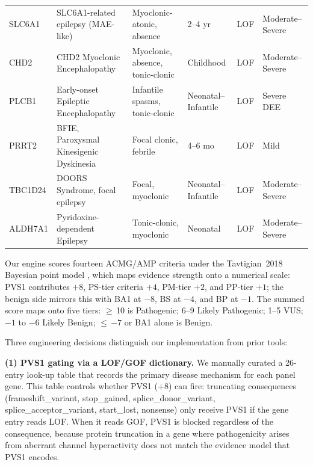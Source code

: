 \documentclass[12pt,a4paper]{article}
\begin{document}
\begin{longtable}{p{1.1cm}p{3.5cm}p{3.5cm}p{2.2cm}p{0.8cm}p{2.2cm}}
SLC6A1  & SLC6A1-related epilepsy (MAE-like)          & Myoclonic-atonic, absence               & 2--4 yr               & LOF     & Moderate--Severe \\
CHD2    & CHD2 Myoclonic Encephalopathy               & Myoclonic, absence, tonic-clonic        & Childhood             & LOF     & Moderate--Severe \\
PLCB1   & Early-onset Epileptic Encephalopathy        & Infantile spasms, tonic-clonic          & Neonatal--Infantile   & LOF     & Severe DEE \\
PRRT2   & BFIE, Paroxysmal Kinesigenic Dyskinesia     & Focal clonic, febrile                   & 4--6 mo               & LOF     & Mild \\
TBC1D24 & DOORS Syndrome, focal epilepsy              & Focal, myoclonic                        & Neonatal--Infantile   & LOF     & Moderate--Severe \\
ALDH7A1 & Pyridoxine-dependent Epilepsy               & Tonic-clonic, myoclonic                 & Neonatal              & LOF     & Moderate--Severe \\
\end{longtable}
\normalsize
\setlength{\tabcolsep}{6pt}

Our engine scores fourteen ACMG/AMP criteria under the
Tavtigian~2018 Bayesian point model \citep{tavtigian2018}, which
maps evidence strength onto a numerical scale: PVS1 contributes
$+8$, PS-tier criteria $+4$, PM-tier $+2$, and PP-tier $+1$; the
benign side mirrors this with BA1 at $-8$, BS at $-4$, and BP at
$-1$. The summed score maps onto five tiers: $\geq$\,10 is
Pathogenic; 6--9 Likely Pathogenic; 1--5 VUS; $-1$ to $-6$
Likely Benign; $\leq$\,$-7$ or BA1 alone is Benign.

Three engineering decisions distinguish our implementation from
prior tools:

\textbf{(1) PVS1 gating via a LOF/GOF dictionary.}
We manually curated a 26-entry look-up table that records the
primary disease mechanism for each panel gene. This table controls
whether PVS1 ($+8$) can fire: truncating consequences
(frameshift\_variant, stop\_gained, splice\_donor\_variant,
splice\_acceptor\_variant, start\_lost, nonsense) only receive
PVS1 if the gene entry reads LOF. When it reads GOF, PVS1 is
blocked regardless of the consequence, because protein truncation
in a gene where pathogenicity arises from aberrant channel
hyperactivity does not match the evidence model that PVS1 encodes.
\end{document}
